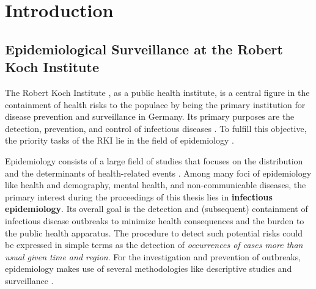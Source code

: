 \chapter{Introduction}

\section{Epidemiological Surveillance at the Robert Koch Institute}
  The Robert Koch Institute , as a public health institute, is a central figure in the containment of health risks to the populace by being the primary institution for disease prevention and surveillance in Germany.
  Its primary purposes are the detection, prevention, and control of infectious diseases \citep{rki_definition}.
  To fulfill this objective, the priority tasks of the RKI lie in the field of epidemiology \citep{rki_definition}.

  Epidemiology consists of a large field of studies that focuses on the distribution and the determinants of health-related events \citep{WHOepi}.
  Among many foci of epidemiology like health and demography, mental health, and non-communicable diseases, the primary interest during the proceedings of this thesis lies in \textbf{infectious epidemiology}.
  Its overall goal is the detection and (subsequent) containment of infectious disease outbreaks to minimize health consequences and the burden to the public health apparatus.
  The procedure to detect such potential risks could be expressed in simple terms as the detection of \textit{occurrences of cases more than usual given time and region}.
  For the investigation and prevention of outbreaks, epidemiology makes use of several methodologies like descriptive studies and surveillance \citep{WHOepi}.


